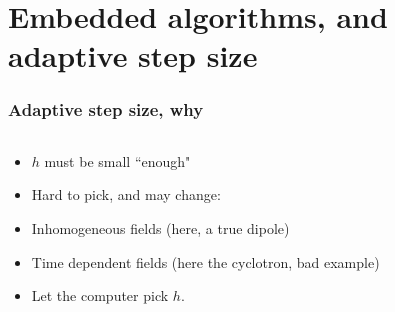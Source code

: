 \documentclass{beamer}
\begin{document}
    \section{Embedded algorithms, and adaptive step size}
\fi


\begin{frame}
\frametitle{Adaptive step size, why}

\begin{columns}
\begin{column}{0.5\linewidth}
\begin{itemize}
\item <1-> $h$ must be small ``enough"

\item <2-> Hard to pick, and may change:

\item <3-> Inhomogeneous fields (here, a true dipole)

\item <4-> Time dependent fields (here the cyclotron, bad example)

\item <5-> Let the computer pick $h$.

\end{itemize}
\end{column}
\begin{column}{0.5\linewidth}


%


\end{column}
\end{columns}
\end{frame}
\end{document}
